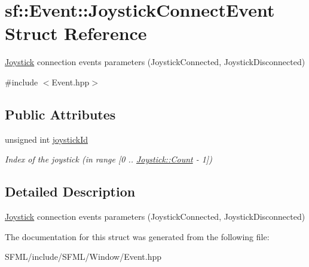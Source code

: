 \hypertarget{structsf_1_1_event_1_1_joystick_connect_event}{}\section{sf\+:\+:Event\+:\+:Joystick\+Connect\+Event Struct Reference}
\label{structsf_1_1_event_1_1_joystick_connect_event}


\mbox{\hyperlink{classsf_1_1_joystick}{Joystick}} connection events parameters (Joystick\+Connected, Joystick\+Disconnected)  




{\ttfamily \#include $<$Event.\+hpp$>$}

\subsection*{Public Attributes}
\begin{DoxyCompactItemize}
\item 
\mbox{\label{structsf_1_1_event_1_1_joystick_connect_event_a08e58e8559d3e4fe4654855fec79194b}} 
unsigned int \mbox{\hyperlink{structsf_1_1_event_1_1_joystick_connect_event_a08e58e8559d3e4fe4654855fec79194b}{joystick\+Id}}
\begin{DoxyCompactList}\small\item\em Index of the joystick (in range \mbox{[}0 .. \mbox{\hyperlink{classsf_1_1_joystick_aee00dd432eacd8369d279b47c3ab4cc5a6e0a2a95bc1da277610c04d80f52715e}{Joystick\+::\+Count}} -\/ 1\mbox{]}) \end{DoxyCompactList}\end{DoxyCompactItemize}


\subsection{Detailed Description}
\mbox{\hyperlink{classsf_1_1_joystick}{Joystick}} connection events parameters (Joystick\+Connected, Joystick\+Disconnected) 

\begin{DoxyVerb}\end{DoxyVerb}
 

The documentation for this struct was generated from the following file\+:\begin{DoxyCompactItemize}
\item 
S\+F\+M\+L/include/\+S\+F\+M\+L/\+Window/Event.\+hpp\end{DoxyCompactItemize}
